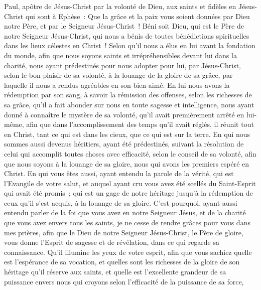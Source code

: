 \par\nobreak\noindent\hrulefill
\begin{multicols}{2}
\VerseOne{}Paul, apôtre de Jésus-Christ par la volonté de Dieu, aux saints et fidèles en Jésus-Christ qui sont à Ephèse~:
Que la grâce et la paix vous soient données par Dieu notre Père, et par le Seigneur Jésus-Christ~!
Béni soit Dieu, qui est le Père de notre Seigneur Jésus-Christ, qui nous a bénis de toutes bénédictions spirituelles dans les lieux célestes en Christ~!
Selon qu'il nous a élus en lui avant la fondation du monde, afin que nous soyons saints et irrépréhensibles devant lui dans la charité, 
nous ayant prédestinés pour nous adopter pour lui, par Jésus-Christ, selon le bon plaisir de sa volonté,
à la louange de la gloire de sa grâce, par laquelle il nous a rendus agréables en son bien-aimé.
En lui nous avons la rédemption par son sang, à savoir la rémission des offenses, selon les richesses de sa grâce,
qu'il a fait abonder sur nous en toute sagesse et intelligence,
nous ayant donné à connaître le mystère de sa volonté, qu'il avait premièrement arrêté en lui-même,
afin que dans l'accomplissement des temps qu'il avait réglés, il réunit tout en Christ, tant ce qui est dans les cieux, que ce qui est sur la terre. 
 En qui nous sommes aussi devenus héritiers, ayant été prédestinés, suivant la résolution de celui qui accomplit toutes choses avec efficacité, selon le conseil de sa volonté,
afin que nous soyons à la louange de sa gloire, nous qui avons les premiers espéré en Christ.
En qui vous êtes aussi, ayant entendu la parole de la vérité, qui est l'Evangile de votre salut, et auquel ayant cru vous avez été scellés du Saint-Esprit qui avait été promis~;
qui est un gage de notre héritage jusqu'à la rédemption de ceux qu'il s'est acquis, à la louange de sa gloire.
C'est pourquoi, ayant aussi entendu parler de la foi que vous avez en notre Seigneur Jésus, et de la charité que vous avez envers tous les saints,
je ne cesse de rendre grâces pour vous dans mes prières,
afin que le Dieu de notre Seigneur Jésus-Christ, le Père de gloire, vous donne l'Esprit de sagesse et de révélation, dans ce qui regarde sa connaissance.
Qu'il illumine les yeux de votre esprit, afin que vous sachiez quelle est l'espérance de sa vocation, et quelles sont les richesses de la gloire de son héritage qu'il réserve aux saints,
et quelle est l'excellente grandeur de sa puissance envers nous qui croyons selon l'efficacité de la puissance de sa force, 

\end{multicols}
